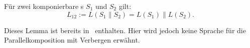 \begin{lem}
  \label{LemmaSprache}
  Für zwei komponierbare \EIO{}s $S_1$ und $S_2$ gilt: \[L_{12} := L(S_1\|S_2) =
  L(S_1)\|L(S_2).\]
\end{lem}

Dieses Lemma ist bereits in~\cite{Vogler2014EIO} enthalten. Hier wird jedoch
keine Sprache für die Parallelkomposition mit Verbergen erwähnt.
